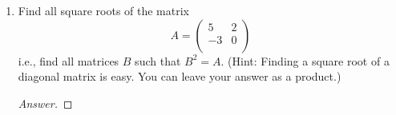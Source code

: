 \documentclass[../psets.tex]{subfiles}
\begin{document}
\begin{enumerate}[label={\textbf{2.\arabic*.}}]
\begin{enumerate}
\begin{proof}[Answer]
\begin{align*}
\begin{pmatrix}
                    3\\
                    2\\
                    1\\
                \end{pmatrix}
            \end{align*}
            It follows that
            \begin{equation*}
                A =
                \begin{pmatrix}
                    1 & 2 & 3\\
                    0 & 1 & 2\\
                    0 & 0 & 1\\
                \end{pmatrix}
                \begin{pmatrix}
                    2 & 0 & 0\\
                    0 & 5 & 0\\
                    0 & 0 & 4\\
                \end{pmatrix}
                \begin{pmatrix}
                    1 & -2 & 1\\
                    0 & 1 & -2\\
                    0 & 0 & 1\\
                \end{pmatrix}
            \end{equation*}
        \end{proof}
    \end{enumerate}
    \item Find all square roots of the matrix
    \begin{equation*}
        A =
        \begin{pmatrix}
            5 & 2\\
            -3 & 0\\
        \end{pmatrix}
    \end{equation*}
    i.e., find all matrices $B$ such that $B^2=A$. (Hint: Finding a square root of a diagonal matrix is easy. You can leave your answer as a product.)
    \begin{proof}[Answer]


\end{proof}
\end{enumerate}
\end{document}
